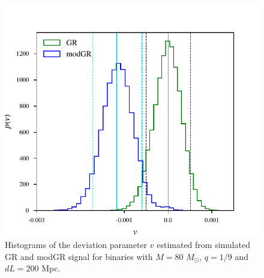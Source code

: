 \documentclass[prd,preprintnumbers,twocolumn,eqsecnum,floatfix,a4paper,nofootinbib,superscriptaddress]{revtex4}
\begin{document}
\newpage
\begin{figure}[h!]
    \begin{center}
    \includegraphics[scale=0.7]{figs/v1_modgr_hist_M_80_q_9_dL_250.pdf} \end{center} 
    \caption{Histograms of the deviation parameter $v$ estimated from simulated GR and modGR signal for binaries with $M=80$ $M_{\odot}$, $q=1/9$ and $dL=200$ Mpc.}
    \label{fig:cs_modgr}
\end{figure}



\end{document}
